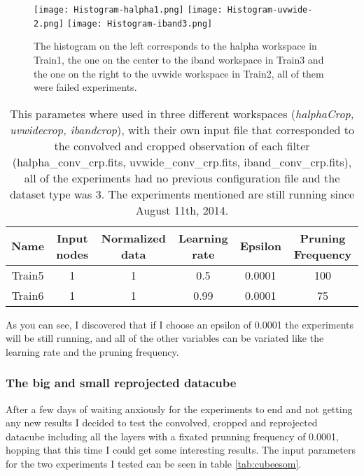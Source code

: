 \documentclass[11pt,fleqn]{book} %
\begin{document}
\begin{figure}[h!]
	\centering
    \texttt{[image: Histogram-halpha1.png]}
    \texttt{[image: Histogram-uvwide-2.png]}
    \texttt{[image: Histogram-iband3.png]}
    \caption{The histogram on the left corresponds to the halpha workspace in Train1, the one on the center to the iband workspace in Train3 and the one on the right to the uvwide workspace in Train2, all of them were failed experiments.}
    \label{img:fail3}
\end{figure}

\begin{table}[h!]
  \centering
    \begin{tabular}{ c c c c c c }
    \hline\hline
    
    Name & Input nodes & Normalized data & Learning rate & Epsilon & Pruning Frequency\\
    \hline
    
    Train5 & 1 & 1 & 0.5 & 0.0001 & 100\\
    Train6 & 1 & 1 & 0.99 & 0.0001 & 75\\

    \hline
  \end{tabular}
  \caption{This parametes where used in three different workspaces (\emph{halphaCrop, uvwidecrop, ibandcrop}), with their own input file that corresponded to the convolved and cropped observation of each filter (halpha\_conv\_crp.fits, uvwide\_conv\_crp.fits, iband\_conv\_crp.fits), all of the experiments had no previous configuration file and the dataset type was 3. The experiments mentioned are still running since August 11th, 2014.}
  \label{tab:threerun}
\end{table}

As you can see, I discovered that if I choose an epsilon of 0.0001 the experiments will be still running, and all of the other variables can be variated like the learning rate and the pruning frequency.

\subsubsection{The big and small reprojected datacube}
After a few days of waiting anxiously for the experiments to end and not getting any new results I decided to test the convolved, cropped and reprojected datacube including all the layers with a fixated prunning frequency of 0.0001, hopping that this time I could get some interesting results. The input parameters for the two experiments I tested can be seen in table \ref{tab:cubeesom}.
\end{document}
